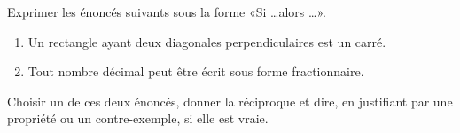 
\begin{exercice}\label{exosmath-0828}

Exprimer les énoncés suivants sous la forme «Si \ldots alors \ldots».
\begin{enumerate}
    \item
       Un rectangle ayant deux diagonales perpendiculaires est un carré.
   \item
       Tout nombre décimal peut être écrit sous forme fractionnaire.
\end{enumerate}

Choisir un de ces deux énoncés, donner la réciproque et dire, en justifiant par une propriété ou un contre-exemple, si elle est vraie.

\end{exercice}
